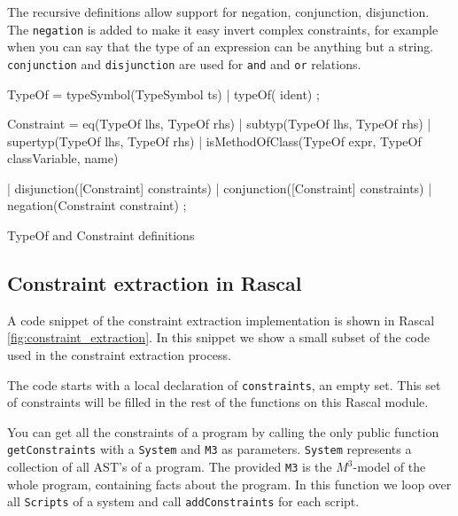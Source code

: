 \documentclass[../main.tex]{subfiles}
\begin{document}
    The recursive definitions allow support for negation, conjunction, disjunction.
    The \texttt{negation} is added to make it easy invert complex constraints, for example when you can say that the type of an expression can be anything but a string.
    \texttt{conjunction} and \texttt{disjunction} are used for \texttt{and} and \texttt{or} relations.
    
    \begin{program}    
    \begin{rascal}%
 TypeOf
    = typeSymbol(TypeSymbol ts)
    | typeOf( ident)
    ;
        
 Constraint 
    = eq(TypeOf lhs, TypeOf rhs)
    | subtyp(TypeOf lhs, TypeOf rhs)
    | supertyp(TypeOf lhs, TypeOf rhs)
    | isMethodOfClass(TypeOf expr, TypeOf classVariable,  name)
    
    | disjunction([Constraint] constraints)
    | conjunction([Constraint] constraints) 
    | negation(Constraint constraint) 
    ;\end{rascal}%
	
	\caption{TypeOf and Constraint definitions}
	\label{fig:typeof_and_constraint}
	\end{program}
    
    \subsection{Constraint extraction in Rascal}
    A code snippet of the constraint extraction implementation\footnotemark{} is shown in Rascal \ref{fig:constraint_extraction}.
	In this snippet we show a small subset of the code used in the constraint extraction process.
	
	The code starts with a local declaration of \texttt{constraints}, an empty set.
	This set of constraints will be filled in the rest of the functions on this Rascal module.
	
	You can get all the constraints of a program by calling the only public function \texttt{getConstraints} with a \texttt{System} and \texttt{M3} as parameters.
	\texttt{System} represents a collection of all AST's of a program.
	The provided \texttt{M3} is the $M^3$-model of the whole program, containing facts about the program.
	In this function we loop over all \texttt{Scripts} of a system and call \texttt{addConstraints} for each script.
	
\end{document}
